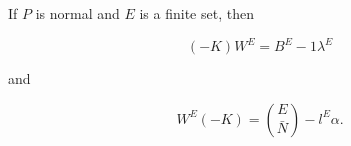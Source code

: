If $P$ is normal and $E$ is a finite set, then

$$(-K)W^E = B^E - 1\lambda^E$$

and

$$W^E(-K) = \binom{E}{\bar{N}} - l^E\alpha.$$
